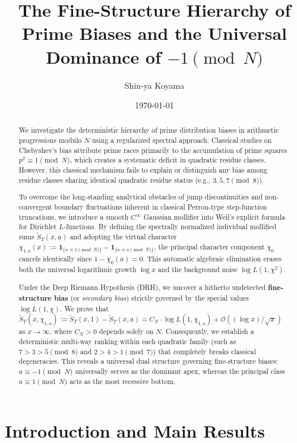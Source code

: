 \documentclass[12pt,reqno]{amsart}
\title[Prime Biases and Dominance of $-1 \pmod N$]{The Fine-Structure Hierarchy of Prime Biases and the Universal Dominance of $-1 \pmod N$}
\author{Shin-ya Koyama}
\date{\today}
\theoremstyle{definition}
\theoremstyle{remark}
\numberwithin{equation}{section}
\begin{document}
\begin{abstract}
We investigate the deterministic hierarchy of prime distribution biases in arithmetic progressions modulo $N$ using a regularized spectral approach. Classical studies on Chebyshev's bias attribute prime races primarily to the accumulation of prime squares $p^2 \equiv 1 \pmod N$, which creates a systematic deficit in quadratic residue classes. However, this classical mechanism fails to explain or distinguish any bias among residue classes sharing identical quadratic residue status (e.g., $3, 5, 7 \pmod 8$).

To overcome the long-standing analytical obstacles of jump discontinuities and non-convergent boundary fluctuations inherent in classical Perron-type step-function truncations, we introduce a smooth $C^\infty$ Gaussian mollifier into Weil's explicit formula for Dirichlet $L$-functions. By defining the spectrally normalized individual mollified sums 
$\widetilde S_T(x, a)$ and adopting the virtual character $\chi_{1,a}(x) := \mathbf{1}_{\{x \equiv 1 \pmod N\}} - \mathbf{1}_{\{x \equiv a \pmod N\}}$, the principal character component $\chi_0$ cancels identically since $1 - \overline{\chi_0}(a) = 0$. This automatic algebraic elimination erases both the universal logarithmic growth $\log x$ and the background noise $\log L(1, \chi^2)$.

Under the Deep Riemann Hypothesis (DRH), we uncover a hitherto undetected \textbf{fine-structure bias} (or \emph{secondary bias}) strictly governed by the special values $\log L(1, \chi)$. We prove that 
$\widetilde S_T(x, \chi_{1,a}) := \widetilde S_T(x, 1) - \widetilde S_T(x, a) = C_N \cdot \log L(1, \chi_{1,a}) + \mathcal{O}((\log x)/\sqrt x)$ as $x \to \infty$, where $C_N > 0$ depends solely on $N$. Consequently, we establish a deterministic multi-way ranking within each quadratic family (such as $7 > 3 > 5 \pmod 8$ and $2 > 4 > 1 \pmod 7$) that completely breaks classical degeneracies. This reveals a universal dual structure governing fine-structure biases: $a \equiv -1 \pmod N$ universally serves as the dominant apex, whereas the principal class $a \equiv 1 \pmod N$ acts as the most recessive bottom.
\end{abstract}

\maketitle

\section{Introduction and Main Results}
\end{document}
